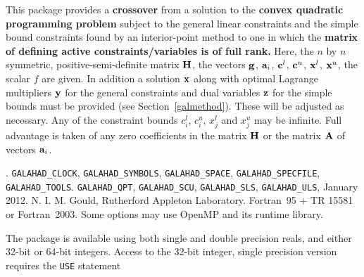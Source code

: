 \documentclass{galahad}
\newcommand{\packagename}{CRO}
\newcommand{\fullpackagename}{\libraryname\_\packagename}
\begin{document}
\galheader


\galsummary
This package provides a {\bf crossover} from a solution
to the {\bf convex quadratic programming problem}
subject to the general linear constraints
and the simple bound constraints
found by an interior-point method to one in which the
{\bf matrix of defining
active constraints/variables is of full rank.}
Here, the $n$ by $n$ symmetric, positive-semi-definite matrix ${\mathbf{H}}$, the
vectors ${\mathbf{g}}$, ${\mathbf{a}}_{i}$, ${\mathbf{c}}^{l}$, ${\mathbf{c}}^{u}$, ${\mathbf{x}}^{l}$,
${\mathbf{x}}^{u}$, the scalar $f$ are given. In addition a solution ${\mathbf{x}}$ along
with optimal Lagrange multipliers ${\mathbf{y}}$ for the general constraints
and dual variables ${\mathbf{z}}$ for the simple bounds must be provided
(see Section~\ref{galmethod}).
These will be adjusted as necessary.
Any of the constraint bounds $c_{i}^{l}$, $c_{i}^{u}$,
$x_{j}^{l}$ and $x_{j}^{u}$ may be infinite.
Full advantage is taken of any zero coefficients in the matrix ${\mathbf{H}}$
or the matrix ${\mathbf{A}}$ of vectors ${\mathbf{a}}_{i}$.


\galattributes
\galversions{\tt  \fullpackagename\_single, \fullpackagename\_double}.
\galuses
{\tt GALAHAD\_CLOCK},
{\tt GALAHAD\_SY\-M\-BOLS},
{\tt GALAHAD\-\_SPACE},
{\tt GALAHAD\_\-SPECFILE},
{\tt GALAHAD\_TOOLS}.
{\tt GALAHAD\_QPT},
{\tt GALAHAD\_\-SCU},
{\tt GALAHAD\_\-SLS},
{\tt GALAHAD\_\-ULS},
\galdate January 2012.
\galorigin N. I. M. Gould, Rutherford Appleton Laboratory.
\gallanguage Fortran~95 + TR 15581 or Fortran~2003.
\galparallelism Some options may use OpenMP and its runtime library.


\galhowto


The package is available using both single and double precision reals, 
and either 32-bit or 64-bit integers. Access to the 32-bit integer,
single precision version requires the {\tt USE} statement
\medskip
\end{document}
